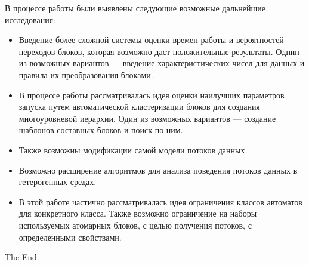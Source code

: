 \documentclass[10pt,a4paper,onecolumn]{report}
\begin{document}
  В процессе работы были выявлены следующие возможные дальнейшие исследования:
  \begin{itemize}
    \item Введение более сложной системы оценки времен работы и вероятностей переходов блоков, которая возможно даст положительные результаты.
          Однин из возможных вариантов --- введение характеристических чисел для данных и правила их преобразования блоками.
    \item В процессе работы рассматривалась идея оценки наилучших параметров запуска путем автоматической кластеризации блоков для создания многоуровневой иерархии.
          Один из возможных вариантов --- создание шаблонов составных блоков и поиск по ним.
    \item Также возможны модификации самой модели потоков данных.
    \item Возможно расширение алгоритмов для анализа поведения потоков данных в гетерогенных средах.
    \item В этой работе частично рассматривалась идея ограничения классов автоматов для конкретного класса. Также возможно ограничение на наборы используемых атомарных блоков,
          с целью получения потоков, с определенными свойствами.
  \end{itemize}
  
  The End.
\end{document}
